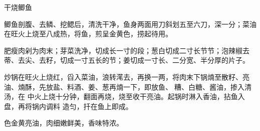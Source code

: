 %
%
%
%
%
%
%
\begin{recipe}{干烧鲫鱼}

\ingredients


\preparation

\step 鲫鱼剖腹、去鳞、挖鳃后，清洗干净，鱼身两面用刀斜划五至六刀，深一分；菜油
在旺火上烧至八成热，将鱼，煎呈金黄色，捞起待用。

\step 肥瘦肉剁为肉末；芽菜洗净，切成长一寸的段；葱白切成二寸长节节；泡辣椒去
蒂、去尖、去籽，切成一寸五长的节；姜切成一寸长、二分宽、半分厚的片子。

\step 炒锅在旺火上烧红，舀入菜油，浪转滗去，再换一两，将肉末下锅煵至散籽、亮
油、煵酥，先放盐、料酒、姜、葱再煵一下，即放鱼、𰪿糟、白糖、酱油，掺入清汤，在
中火上烧十分钟，翻面再烧，烧至收干亮油。起锅时淋入香油，拈鱼入盘，再将锅内调料
造匀，扦在鱼上即成。

\features

色金黄亮油，肉细嫩鲜美，香味特浓。

\end{recipe}

